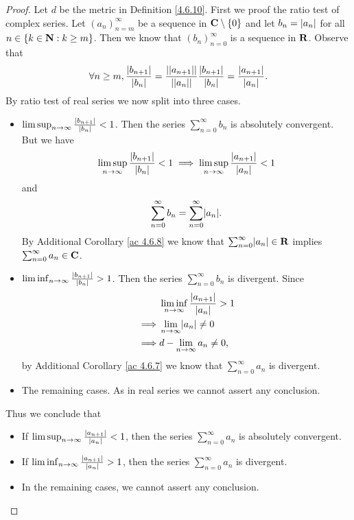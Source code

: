 \begin{proof}
    Let \(d\) be the metric in Definition \ref{4.6.10}.
    First we proof the ratio test of complex series.
    Let \((a_n)_{n = m}^\infty\) be a sequence in \(\mathbf{C} \setminus \{0\}\) and let \(b_n = \left\lvert a_n\right\rvert\) for all \(n \in \{k \in \mathbf{N} : k \geq m\}\).
    Then we know that \((b_n)_{n = 0}^\infty\) is a sequence in \(\mathbf{R}\).
    Observe that
    \[
        \forall n \geq m, \frac{\left\lvert b_{n + 1}\right\rvert}{\left\lvert b_n\right\rvert} = \frac{\left\lvert\left\lvert a_{n + 1}\right\rvert\right\rvert}{\left\lvert\left\lvert a_n\right\rvert\right\rvert} \frac{\left\lvert b_{n + 1}\right\rvert}{\left\lvert b_n\right\rvert} = \frac{\left\lvert a_{n + 1}\right\rvert}{\left\lvert a_n\right\rvert}.
    \]
    By ratio test of real series we now split into three cases.
    \begin{itemize}
        \item \(\limsup_{n \to \infty} \frac{\left\lvert b_{n + 1}\right\rvert}{\left\lvert b_n\right\rvert} < 1\).
              Then the series \(\sum_{n = 0}^\infty b_n\) is absolutely convergent.
              But we have
              \[
                  \limsup_{n \to \infty} \frac{\left\lvert b_{n + 1}\right\rvert}{\left\lvert b_n\right\rvert} < 1 \implies \limsup_{n \to \infty} \frac{\left\lvert a_{n + 1}\right\rvert}{\left\lvert a_n\right\rvert} < 1
              \]
              and
              \[
                  \sum_{n = 0}^\infty b_n = \sum_{n = 0}^\infty \abs{a_n}.
              \]
              By Additional Corollary \ref{ac 4.6.8} we know that \(\sum_{n = 0}^\infty \abs{a_n} \in \R\) implies \(\sum_{n = 0}^\infty a_n \in \mathbf{C}\).
        \item \(\liminf_{n \to \infty} \frac{\left\lvert b_{n + 1}\right\rvert}{\left\lvert b_n\right\rvert} > 1\).
              Then the series \(\sum_{n = 0}^\infty b_n\) is divergent.
              Since
              \begin{align*}
                           & \liminf_{n \to \infty} \frac{\abs{a_{n + 1}}}{\abs{a_n}} > 1 \\
                  \implies & \lim_{n \to \infty} \abs{a_n} \neq 0                         \\
                  \implies & d - \lim_{n \to \infty} a_n \neq 0,
              \end{align*}
              by Additional Corollary \ref{ac 4.6.7} we know that \(\sum_{n = 0}^\infty a_n\) is divergent.
        \item The remaining cases.
              As in real series we cannot assert any conclusion.
    \end{itemize}
    Thus we conclude that
    \begin{itemize}
        \item If \(\limsup_{n \to \infty} \frac{\left\lvert a_{n + 1}\right\rvert}{\left\lvert a_n\right\rvert} < 1\), then the series \(\sum_{n = 0}^\infty a_n\) is absolutely convergent.
        \item If \(\liminf_{n \to \infty} \frac{\left\lvert a_{n + 1}\right\rvert}{\left\lvert a_n\right\rvert} > 1\), then the series \(\sum_{n = 0}^\infty a_n\) is divergent.
        \item In the remaining cases, we cannot assert any conclusion.
    \end{itemize}


\end{proof}

